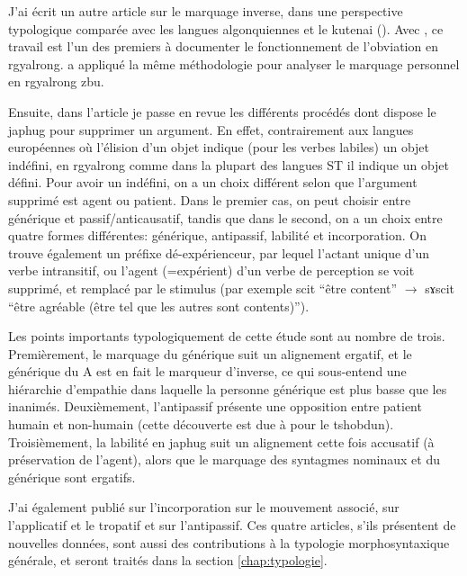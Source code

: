 \documentclass[oldfontcommands,oneside,a4paper,11pt]{memoir}
\newcommand{\ipa}[1]{{\phon #1}} %
\begin{document}
	J'ai écrit un autre article sur le marquage inverse, dans une perspective typologique comparée avec les langues algonquiennes et le kutenai (\citealt{jacques10inverse}). Avec \citet{jackson02rentongdengdi}, ce travail est l'un des premiers à documenter le fonctionnement de l'obviation en rgyalrong.   \citet{gongxun14agreement} a appliqué la même méthodologie pour analyser le marquage personnel en rgyalrong zbu. 
	
Ensuite, dans l'article \citet{jacques12demotion}   je passe en revue les différents procédés dont dispose le japhug pour supprimer un argument. En effet, contrairement aux langues européennes où l'élision d'un objet indique (pour les verbes labiles) un objet indéfini, en rgyalrong comme dans la plupart des langues ST il indique un objet défini. Pour avoir un indéfini, on a un choix différent selon que l'argument supprimé est agent ou patient. Dans le premier cas, on peut choisir entre générique et passif/anticausatif, tandis que dans le second, on a un choix entre quatre formes différentes: générique, antipassif, labilité et incorporation. On trouve également un préfixe dé-expérienceur, par lequel l'actant unique d'un verbe intransitif, ou l'agent (=expérient) d'un verbe de perception se voit supprimé, et remplacé par le stimulus (par exemple \ipa{scit} ``être content'' $\rightarrow $ \ipa{sɤscit} ``être agréable (être tel que les autres sont contents)'').
	
	Les points importants typologiquement de cette étude sont au nombre de trois. Premièrement, le marquage du générique suit un alignement ergatif, et le générique du A est en fait le marqueur d'inverse, ce qui sous-entend une hiérarchie d'empathie dans laquelle la personne générique est plus basse que les inanimés. Deuxièmement, l'antipassif présente une opposition entre patient humain et non-humain (cette découverte est due à \citet{jackson06paisheng} pour le tshobdun). Troisièmement, la labilité en japhug suit un alignement cette fois accusatif (à préservation de l'agent), alors que le marquage des syntagmes nominaux et du générique sont ergatifs. 
	
	J'ai également publié \citet{jacques12incorp} sur l'incorporation   \citet{jacques13harmonization} sur le mouvement associé, \citet{jacques13tropative} sur l'applicatif et le tropatif et \citet{jacques14antipassive} sur l'antipassif. Ces quatre articles, s'ils présentent de nouvelles données, sont aussi des contributions à la typologie morphosyntaxique générale, et seront traités dans la section \ref{chap:typologie}. 
	
\end{document}
